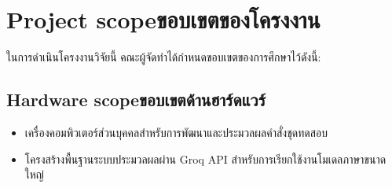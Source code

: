 \section{\ifenglish Project scope\else ขอบเขตของโครงงาน\fi}

ในการดำเนินโครงงานวิจัยนี้ คณะผู้จัดทำได้กำหนดขอบเขตของการศึกษาไว้ดังนี้:

\subsection{\ifenglish Hardware scope\else ขอบเขตด้านฮาร์ดแวร์\fi}
\begin{itemize}
    \item เครื่องคอมพิวเตอร์ส่วนบุคคลสำหรับการพัฒนาและประมวลผลคำสั่งชุดทดสอบ 
    \item โครงสร้างพื้นฐานระบบประมวลผลผ่าน Groq API สำหรับการเรียกใช้งานโมเดลภาษาขนาดใหญ่ 
\end{itemize}

